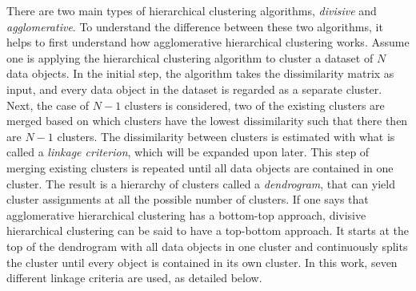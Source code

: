 There are two main types of hierarchical clustering algorithms, \textit{divisive} and \textit{agglomerative}. To understand the difference between these two algorithms, it helps to first understand how agglomerative hierarchical clustering works. Assume one is applying the hierarchical clustering algorithm to cluster a dataset of $N$ data objects. In the initial step, the algorithm takes the dissimilarity matrix as input, and every data object in the dataset is regarded as a separate cluster. Next, the case of $N-1$ clusters is considered, two of the existing clusters are merged based on which clusters have the lowest dissimilarity such that there then are $N-1$ clusters. The dissimilarity between clusters is estimated with what is called a \textit{linkage criterion}, which will be expanded upon later. This step of merging existing clusters is repeated until all data objects are contained in one cluster. The result is a hierarchy of clusters called a \textit{dendrogram}, that can yield cluster assignments at all the possible number of clusters. If one says that agglomerative hierarchical clustering has a bottom-top approach, divisive hierarchical clustering can be said to have a top-bottom approach. It starts at the top of the dendrogram with all data objects in one cluster and continuously splits the cluster until every object is contained in its own cluster. In this work, seven different linkage criteria are used, as detailed below.


